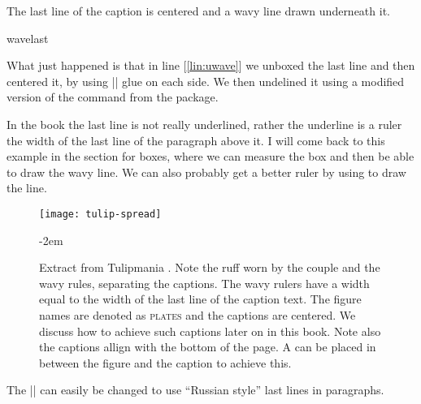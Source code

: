 The last line of the caption is centered and a wavy line drawn underneath it.

\begin{texexample}{wavelast}{}
\end{texexample}

\begin{teX}
\def\wavelast#1{%
       \bgroup
       \setbox0=\vbox{\bf\noindent #1}%
       \setbox1=\vbox{%
            \unvbox0
            \setbox2=\lastbox
            \hbox to \linewidth{\hfill\uwave{\unhbox2}\hfill}(*@\label{lin:uwave}@*)%
       }%
       \unvbox1
      \egroup
  }%
\end{teX}

What just happened is that in line [\ref{lin:uwave}] we unboxed the last line and then centered it, by using |\hfill| glue on each side. We then undelined it using a modified version of the command \cmd{\uwave} from the  package.

In the book the last line is not really underlined, rather the underline is a ruler the width of the last line of the paragraph above it. I will come back to this example in the section for boxes, where we can measure the box and then be able to draw the wavy line. We can also probably get a better ruler by using \tikzname to draw the line.

\begin{figure}[bt]
\texttt{[image: tulip-spread]}\par
{\leftskip-2em

\caption{Extract from Tulipmania \protect{}. Note the ruff worn by the couple and the wavy rules, separating the captions. The wavy rulers have a width equal to the width of the last line of the caption text. The figure names are denoted as \textsc{plates} and the captions are centered. We discuss how to achieve such captions later on in this book. Note also the captions allign with the bottom of the page. A \cmd{\vfill} can be placed in between the figure and the caption to achieve this. }\par}

\end{figure}

The |\hbox| can easily be changed to use \enquote{Russian style} last lines in paragraphs.

